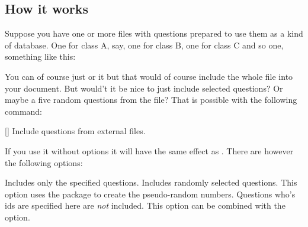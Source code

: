 \documentclass[load-preamble+]{cnltx-doc}
\begin{document}
\subsection{How it works}
Suppose you have one or more files with questions prepared to use them as a
kind of database.  One for class A, say, one for class B, one for class C and
so one, something like this:
You can of course just  or  it but that would of
course include the whole file into your document.  But would't it be nice to
just include selected questions?  Or maybe a five random questions from the
file?  That is possible with the following command:
\begin{commands}
  []
    Include questions from external files.
\end{commands}
If you use it without options it will have the same effect as .
There are however the following options:
\begin{options}
  \Default
    Includes only the specified questions.
  \Default
    Includes  randomly selected questions.  This option uses the
     package to create the pseudo-random numbers.
  \Default
    Questions who's \acp{id} are specified here are \emph{not} included.  This
    option can be combined with the  option.
\end{options}
\end{document}
